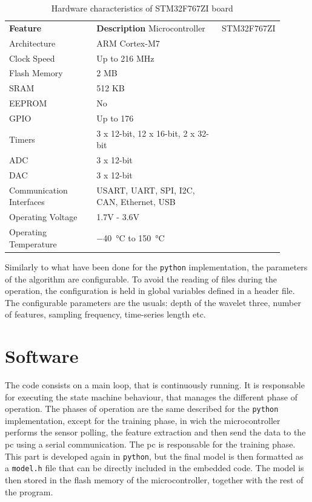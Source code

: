 \begin{longtable}{p{0.35\linewidth}p{0.55\linewidth}}
    \caption{Hardware characteristics of STM32F767ZI board}    \label{tab:stm32f767zi}\\
    \toprule
    \textbf{Feature} & \textbf{Description} \endfirsthead 
    \hline
    Microcontroller & STM32F767ZI \\
    Architecture & ARM Cortex-M7 \\
    Clock Speed & Up to 216 MHz \\
    Flash Memory & 2 MB \\
    SRAM & 512 KB \\
    EEPROM & No \\
    GPIO & Up to 176 \\
    Timers & 3 x 12-bit, 12 x 16-bit, 2 x 32-bit \\
    ADC & 3 x 12-bit \\
    DAC & 3 x 12-bit \\
    Communication Interfaces & USART, UART, SPI, I2C, CAN, Ethernet, USB \\
    Operating Voltage & 1.7V - 3.6V \\
    Operating Temperature & \SI{-40}{\celsius} to \SI{+150}{\celsius} \\
    \bottomrule    
\end{longtable}

Similarly to what have been done for the \texttt{python} implementation, the parameters of the algorithm are configurable. To avoid the reading of files during the operation, the configuration is held in global variables defined in a header file. The configurable parameters are the usuals: depth of the wavelet three, number of features, sampling frequency, time-series length etc.

\section{Software}
The code consists on a main loop, that is continuously running. It is responsable for executing the state machine behaviour, that manages the different phase of operation. The phases of operation are the same described for the \texttt{python} implementation, except for the training phase, in wich the microcontroller performs the sensor polling, the feature extraction and then send the data to the \gls{pc} using a serial communication. The \gls{pc} is responsable for the training phase. This part is developed again in \texttt{python}, but the final model is then formatted as a \texttt{model.h} file that can be directly included in the embedded code. The model is then stored in the flash memory of the microcontroller, together with the rest of the program.

